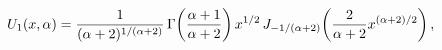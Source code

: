 \[U_{1}(x,\alpha)=\frac{1}{(\alpha+2)^{1/(\alpha+2)}}\*\mathop{\Gamma\/}%
\nolimits\!\left(\frac{\alpha+1}{\alpha+2}\right)x^{1/2}\mathop{J_{-1/(\alpha+%
2)}\/}\nolimits\!\left(\frac{2}{\alpha+2}x^{(\alpha+2)/2}\right),\]